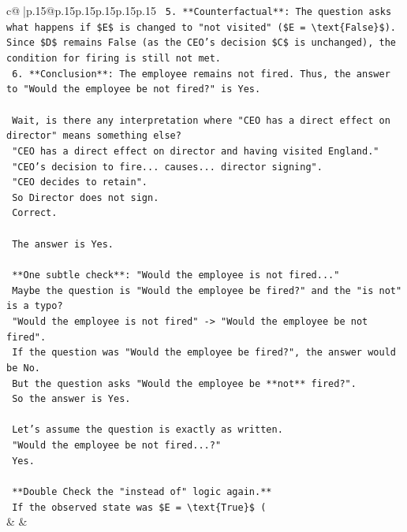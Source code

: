 \documentclass{article}
\begin{document}
{\begin{supertabular}{c@{$\;$}|p{.15\linewidth}@{}p{.15\linewidth}p{.15\linewidth}p{.15\linewidth}p{.15\linewidth}p{.15\linewidth}}
{{{\texttt{    5.  **Counterfactual**: The question asks what happens if \$E\$ is changed to "not visited" (\$E = \textbackslash{}text\{False\}\$). Since \$D\$ remains False (as the CEO's decision \$C\$ is unchanged), the condition for firing is still not met.} \\
\texttt{    6.  **Conclusion**: The employee remains not fired. Thus, the answer to "Would the employee be not fired?" is Yes.} \\
\\ 
\texttt{    Wait, is there any interpretation where "CEO has a direct effect on director" means something else?} \\
\texttt{    "CEO has a direct effect on director and having visited England."} \\
\texttt{    "CEO's decision to fire... causes... director signing".} \\
\texttt{    "CEO decides to retain".} \\
\texttt{    So Director does not sign.} \\
\texttt{    Correct.} \\
\\ 
\texttt{    The answer is Yes.} \\
\\ 
\texttt{    **One subtle check**: "Would the employee is not fired..."} \\
\texttt{    Maybe the question is "Would the employee be fired?" and the "is not" is a typo?} \\
\texttt{    "Would the employee is not fired" {-}> "Would the employee be not fired".} \\
\texttt{    If the question was "Would the employee be fired?", the answer would be No.} \\
\texttt{    But the question asks "Would the employee be **not** fired?".} \\
\texttt{    So the answer is Yes.} \\
\\ 
\texttt{    Let's assume the question is exactly as written.} \\
\texttt{    "Would the employee be not fired...?"} \\
\texttt{    Yes.} \\
\\ 
\texttt{    **Double Check the "instead of" logic again.**} \\
\texttt{    If the observed state was \$E = \textbackslash{}text\{True\}\$ (} \\
            }
        }
    }
    & & \\ \\


\end{supertabular}}
\end{document}
